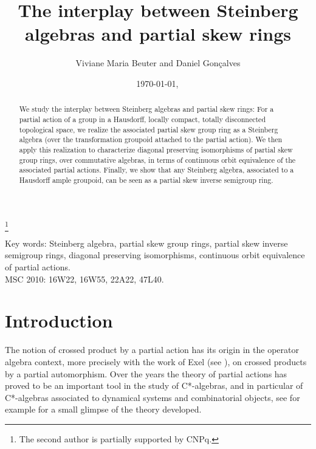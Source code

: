 \documentclass[11pt, a4paper]{amsart}
\theoremstyle{plain}
\begin{document}
\author{Viviane Maria Beuter and Daniel Gonçalves} \thanks{The second author is partially supported by CNPq.}

\title{The interplay between Steinberg algebras and partial skew rings}

\date{\today,\, \currenttime }



\begin{abstract}
We study the interplay between Steinberg algebras and partial skew rings: For a partial action of a group in a Hausdorff, locally compact, totally disconnected topological space, we realize the associated partial skew group ring as a Steinberg algebra (over the transformation groupoid attached to the partial action). We then apply this realization to characterize diagonal preserving isomorphisms of partial skew group rings, over commutative algebras, in terms of continuous orbit equivalence of the associated partial actions. Finally, we show that any Steinberg algebra, associated to a Hausdorff ample groupoid, can be seen as a partial skew inverse semigroup ring.\\
\end{abstract}

\maketitle

\noindent Key words: Steinberg algebra, partial skew group rings, partial skew inverse semigroup rings, diagonal preserving isomorphisms, continuous orbit equivalence of partial actions.\\

\noindent MSC 2010: 16W22, 16W55, 22A22, 47L40.



\pagestyle{headings}

\section{Introduction}

The notion of crossed product by a partial action has its origin in the operator algebra context, more precisely with the work of Exel (see \cite{Exel1}), on crossed products by a partial automorphism. Over the years the theory of partial actions has proved to be an important tool in the study of C*-algebras, and in particular of C*-algebras associated to  dynamical systems and combinatorial objects, see for example \cite{E1, E2, EL, Exel, GRU, GRU1} for a small glimpse of the theory developed. 
\end{document}
